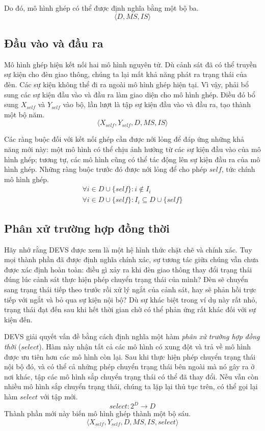 Do đó, mô hình ghép có thể được định nghĩa bằng một bộ ba.
\[
\langle D,MS,IS\rangle
\]

\subsection{Đầu vào và đầu ra}
Mô hình ghép hiện kết nối hai mô hình nguyên tử. Dù cảnh sát đã có thể truyền sự kiện cho đèn giao thông, chúng ta lại mất khả năng phát ra trạng thái của đèn. Các sự kiện không thể đi ra ngoài mô hình ghép hiện tại. Vì vậy, phải bổ sung các sự kiện đầu vào và đầu ra làm giao diện cho mô hình ghép. Điều đó bổ sung $X_{self}$ và $Y_{self}$ vào bộ, lần lượt là tập sự kiện đầu vào và đầu ra, tạo thành một bộ năm.
\[
\langle X_{self},Y_{self},D,MS,IS\rangle
\]

Các ràng buộc đối với kết nối ghép cần được nới lỏng để đáp ứng những khả năng mới này: một mô hình có thể chịu ảnh hưởng từ các sự kiện đầu vào của mô hình ghép; tương tự, các mô hình cũng có thể tác động lên sự kiện đầu ra của mô hình ghép. Những ràng buộc trước đó được nới lỏng để cho phép $self$, tức chính mô hình ghép.
\begin{gather*}
\forall i\in D\cup\{self\}:i\notin I_i\\
\forall i\in D\cup\{self\}:I_i\subseteq D\cup\{self\}
\end{gather*}

\subsection{Phân xử trường hợp đồng thời}
Hãy nhớ rằng DEVS được xem là một hệ hình thức chặt chẽ và chính xác. Tuy mọi thành phần đã được định nghĩa chính xác, sự tương tác giữa chúng vẫn chưa được xác định hoàn toàn: điều gì xảy ra khi đèn giao thông thay đổi trạng thái đúng lúc cảnh sát thực hiện phép chuyển trạng thái của mình? Đèn sẽ chuyển sang trạng thái tiếp theo trước rồi xử lý ngắt của cảnh sát, hay sẽ phản hồi trực tiếp với ngắt và bỏ qua sự kiện nội bộ? Dù sự khác biệt trong ví dụ này rất nhỏ, trạng thái đạt đến sau khi hết thời gian chờ có thể phản ứng rất khác đối với sự kiện đến.

DEVS giải quyết vấn đề bằng cách định nghĩa một hàm \emph{phân xử trường hợp đồng thời} ($select$). Hàm này nhận tất cả các mô hình có xung đột và trả về mô hình được ưu tiên hơn các mô hình còn lại. Sau khi thực hiện phép chuyển trạng thái nội bộ đó,
và có thể cả những phép chuyển trạng thái bên ngoài mà nó gây ra ở nơi khác, tập các mô hình sắp chuyển trạng thái có thể đã thay đổi. Nếu vẫn còn nhiều mô hình sắp chuyển trạng thái, chúng ta lặp lại thủ tục trên, có thể gọi lại hàm $select$ với tập mới.
\[
select:2^D\to D
\]
Thành phần mới này biến mô hình ghép thành một bộ sáu.
\[
\langle X_{self},Y_{self},D,MS,IS,select\rangle
\]

